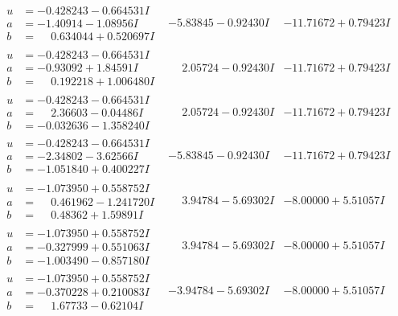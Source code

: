 \documentclass[1p]{elsarticle_modified}
\theoremstyle{definition}
\begin{document}
$$\begin{array}{c|c|c}
\begin{aligned}
u &= -0.428243 - 0.664531 I \\
a &= -1.40914 - 1.08956 I \\
b &= \phantom{-}0.634044 + 0.520697 I\end{aligned}
 & -5.83845 - 0.92430 I & -11.71672 + 0.79423 I \\ \hline\begin{aligned}
u &= -0.428243 - 0.664531 I \\
a &= -0.93092 + 1.84591 I \\
b &= \phantom{-}0.192218 + 1.006480 I\end{aligned}
 & \phantom{-}2.05724 - 0.92430 I & -11.71672 + 0.79423 I \\ \hline\begin{aligned}
u &= -0.428243 - 0.664531 I \\
a &= \phantom{-}2.36603 - 0.04486 I \\
b &= -0.032636 - 1.358240 I\end{aligned}
 & \phantom{-}2.05724 - 0.92430 I & -11.71672 + 0.79423 I \\ \hline\begin{aligned}
u &= -0.428243 - 0.664531 I \\
a &= -2.34802 - 3.62566 I \\
b &= -1.051840 + 0.400227 I\end{aligned}
 & -5.83845 - 0.92430 I & -11.71672 + 0.79423 I \\ \hline\begin{aligned}
u &= -1.073950 + 0.558752 I \\
a &= \phantom{-}0.461962 - 1.241720 I \\
b &= \phantom{-}0.48362 + 1.59891 I\end{aligned}
 & \phantom{-}3.94784 - 5.69302 I & -8.00000 + 5.51057 I \\ \hline\begin{aligned}
u &= -1.073950 + 0.558752 I \\
a &= -0.327999 + 0.551063 I \\
b &= -1.003490 - 0.857180 I\end{aligned}
 & \phantom{-}3.94784 - 5.69302 I & -8.00000 + 5.51057 I \\ \hline\begin{aligned}
u &= -1.073950 + 0.558752 I \\
a &= -0.370228 + 0.210083 I \\
b &= \phantom{-}1.67733 - 0.62104 I\end{aligned}
 & -3.94784 - 5.69302 I & -8.00000 + 5.51057 I \\ \hline\begin{aligned}

\end{aligned}
\end{array}$$
\end{document}

